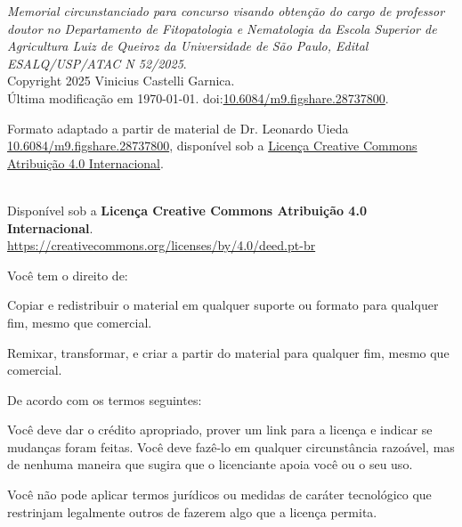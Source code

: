 \documentclass[12pt,a4paper,oneside]{book}
\newcommand{\Year}{2025}
\newcommand{\Author}{Vinicius Castelli Garnica}
\newcommand{\TitlePDF}{Memorial circunstanciado para concurso visando obtenção do cargo de professor doutor no Departamento de Fitopatologia e Nematologia da Escola Superior de Agricultura Luiz de Queiroz da Universidade de São Paulo, Edital ESALQ/USP/ATAC N 52/2025}
\newcommand{\MemorialDOI}{10.6084/m9.figshare.28737800}
\begin{document}
  {\small
  
  \vspace*{\fill}
  
  \noindent
  \textit{\TitlePDF{}}.
  \\[0.2cm]
  \textcopyright{} Copyright \Year{} \Author{}.
  \\[0.2cm]
  Última modificação em \today.
  doi:\href{https://doi.org/\MemorialDOI}{\MemorialDOI}.
  
  \vspace{0.5cm}
  \noindent
  {\footnotesize
  Formato adaptado a partir de material de Dr. Leonardo Uieda \href{https://doi.org/10.6084/m9.figshare.28737800}{10.6084/m9.figshare.28737800}, disponível sob a \href{https://creativecommons.org/licenses/by/4.0/deed.pt-br}{Licença Creative Commons Atribuição 4.0 Internacional}.
  }

  \vspace{2cm}
  
  \noindent
  \textbf{\LARGE \faCreativeCommons{} \faCreativeCommonsBy{}}
  \\
  Disponível sob a
  \textbf{Licença Creative Commons Atribuição 4.0 Internacional}.
  \\
  \url{https://creativecommons.org/licenses/by/4.0/deed.pt-br}
  
  \vspace{0.25cm}
  
  \noindent
  Você tem o direito de:
  
  \begin{description}[labelindent=0.5cm]
      \item[Compartilhar ---]{
          Copiar e redistribuir o material em qualquer suporte ou formato para
          qualquer fim, mesmo que comercial.
      }
      \item[Adaptar ---]{
          Remixar, transformar, e criar a partir do material para qualquer fim,
          mesmo que comercial.
      }
  \end{description}
  
  \vspace{0.25cm}
  
  \noindent
  De acordo com os termos seguintes:
  
  \begin{description}[labelindent=0.5cm]
      \item[Atribuição ---]{
           Você deve dar o crédito apropriado, prover um link para a licença
           e indicar se mudanças foram feitas. Você deve fazê-lo em qualquer
           circunstância razoável, mas de nenhuma maneira que sugira que
           o licenciante apoia você ou o seu uso.
      }
      \item[Sem restrições adicionais ---]{
          Você não pode aplicar termos jurídicos ou medidas de caráter
          tecnológico que restrinjam legalmente outros de fazerem algo que
          a licença permita.
  }
  \end{description}
  
  \vspace{1.5cm}
  
  }
\end{document}
